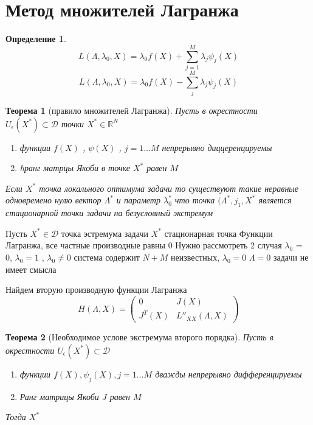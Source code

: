 \documentclass[14pt]{extarticle}
\newtheorem{theorem}{Теорема}
\newtheorem{definition}{Определение}
\begin{document}
\section{Метод множителей Лагранжа}
\begin{definition}
	\begin{equation}
		L(\Lambda,\lambda_0,X) = \lambda_0 f(X) +
		\sum_{j = 1}^{M} \lambda_{j} \psi_{j}(X)
	\end{equation}
	\begin{equation}
		L(\Lambda,\lambda_0,X) = \lambda_0 f(X) - \sum_{j}^{M} \lambda_{j} \psi_{j}(X)
	\end{equation}
\end{definition}
\begin{theorem}[правило множителей Лагранжа]
	Пусть в окрестности $U_{\epsilon}(X^{*}) \subset \mathcal{D}$ 
	точки $X^{*} \in \mathbb{R}^{N}$ 
	\begin{enumerate}
		\item функции $f(X)$ ,  $\psi(X)$ , $j = 1 \dots M$ 
			непрерывно диццеренцируемы
		\item hранг матрцы Якоби в точке  $X^{*}$ равен $M$
	\end{enumerate}
	Если $X^{*}$ точка локального оптимума задачи то 
	существуют такие неравные одновремено нулю
	вектор $\Lambda^{*}$ и параметр $\lambda^{*}_{0}$ 
	что точка $(\Lambda^{*},j_1,X^{*}$ является стационарной точки задачи на
	безусловный экстремум
\end{theorem}
Пусть $X^{*} \in \mathcal{D}$ точка эстремума задачи
$X^{*}$ стационарная точка Функции Лагранжа, все частные производные равны 0
Нужно рассмотреть 2 случая $\lambda_0$ = 0, $\lambda_0 = 1$	,
$\lambda_0 \neq 0$ система содержит $N+M$ неизвестных,  $\lambda_0 = 0$ $\Lambda=0$ задачи не имеет смысла

Найдем вторую производную функции Лагранжа
\begin{equation}
	H(\Lambda,X) =
	\begin{pmatrix} 
		0 & J(X) \\
		J^{T}(X) & L''_{XX}(\Lambda,X)
	\end{pmatrix} 
\end{equation}
\begin{theorem}[Необходимое услове экстремума второго порядка]
	Пусть в окрестности $U_{\epsilon}(X^{*}) \subset \mathcal{D}$ 
	\begin{enumerate}
		\item функции $f(X), \psi_{j}(X), j = 1 \dots M$ дважды
			непрерывно дифференцируемы
		\item Ранг матрицы Якоби $J$ равен  $M$
	\end{enumerate}
	Тогда $X^{*}$
\end{theorem}
\end{document}
